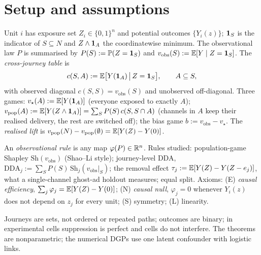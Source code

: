 \section{Setup and assumptions}

\begin{definition}
\label{attr:def:table}
Unit $i$ has exposure set $Z_i \in \{0,1\}^n$ and potential outcomes $\{Y_i(z)\}$; $\mathbf{1}_S$ is the indicator of $S \subseteq N$ and $Z \wedge \mathbf{1}_A$ the coordinatewise minimum. The observational law $P$ is summarised by $P(S) := \mathbb{P}(Z = \mathbf{1}_S)$ and $v_{\mathrm{obs}}(S) := \mathbb{E}[Y \mid Z = \mathbf{1}_S]$. The \emph{cross-journey table} is
\begin{equation}
c(S, A) := \mathbb{E}\big[Y(\mathbf{1}_A) \,\big|\, Z = \mathbf{1}_S\big], \qquad A \subseteq S,
\label{eq:attr:table}
\end{equation}
with observed diagonal $c(S,S) = v_{\mathrm{obs}}(S)$ and unobserved off-diagonal. Three games: $v_\star(A) := \mathbb{E}[Y(\mathbf{1}_A)]$ (everyone exposed to exactly $A$); $v_{\mathrm{pop}}(A) := \mathbb{E}[Y(Z \wedge \mathbf{1}_A)] = \sum_S P(S)\,c(S, S \cap A)$ (channels in $A$ keep their realised delivery, the rest are switched off); the bias game $b := v_{\mathrm{obs}} - v_\star$. The \emph{realised lift} is $v_{\mathrm{pop}}(N) - v_{\mathrm{pop}}(\emptyset) = \mathbb{E}[Y(Z) - Y(0)]$.
\end{definition}

\begin{definition}
\label{attr:def:rules}
An \emph{observational rule} is any map $\varphi(P) \in \mathbb{R}^n$. Rules studied: population-game Shapley $\mathrm{Sh}(v_{\mathrm{obs}})$ (Shao--Li style); journey-level DDA, $\mathrm{DDA}_j := \sum_S P(S)\,\mathrm{Sh}_j(v_{\mathrm{obs}}|_S)$; the removal effect $\tau_j := \mathbb{E}[Y(Z) - Y(Z - e_j)]$, what a single-channel ghost-ad holdout measures; equal split. Axioms: (E) \emph{causal efficiency}, $\sum_j \varphi_j = \mathbb{E}[Y(Z) - Y(0)]$; (N) \emph{causal null}, $\varphi_j = 0$ whenever $Y_i(z)$ does not depend on $z_j$ for every unit; (S) symmetry; (L) linearity.
\end{definition}

\begin{assumption}[Scope]
\label{attr:ass:scope}
Journeys are sets, not ordered or repeated paths; outcomes are binary; in experimental cells suppression is perfect and cells do not interfere. The theorems are nonparametric; the numerical DGPs use one latent confounder with logistic links.
\end{assumption}

